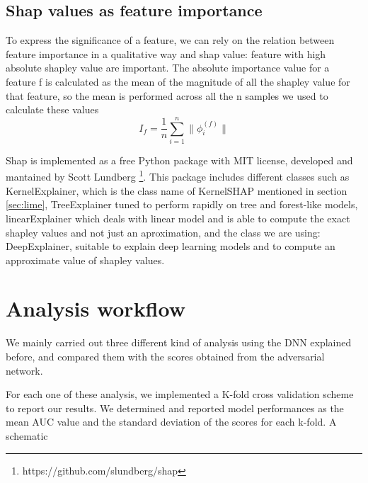 \documentclass[10pt]{report}
\begin{document}
\section{Shap values as feature importance}

To express the significance of a feature, we can rely on the relation between feature importance in a qualitative way and shap value: feature with high absolute shapley value are important.
The absolute importance value for a feature f is calculated as the mean of the magnitude of all the shapley value for that feature, so the mean is performed across all the n samples we used to calculate these values
\begin{equation}\label{eq:shap_magnitude}
I_f = \frac{1}{n} \sum_{i = 1}^n \|\phi_i^{(f)}\|
\end{equation}

Shap is implemented as a free Python package with MIT license, developed and mantained by Scott Lundberg \footnote{https://github.com/slundberg/shap}.
This package includes different classes such as KernelExplainer, which is the class name of KernelSHAP mentioned in section \ref{sec:lime}, TreeExplainer tuned to perform rapidly on tree and forest-like models, linearExplainer which deals with linear model and is able to compute the exact shapley values and not just an aproximation, and the class we are using: DeepExplainer, suitable to explain deep learning models and to compute an approximate value of shapley values.


\newpage




\chapter{Analysis workflow}\label{sec:analysis_workflow}

We mainly carried out three different kind of analysis using the DNN explained before, and compared them with the scores obtained from the adversarial network.

For each one of these analysis, we implemented a K-fold cross validation scheme to report our results. We determined and reported model performances as the mean AUC value and the standard deviation of the scores for each k-fold. A schematic
\end{document}
